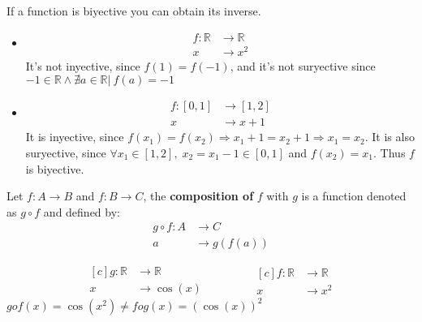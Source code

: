 \documentclass[12pt, a4paper]{book}
\begin{document}
\begin{rem}
  If a function is biyective you can obtain its inverse.
\end{rem}

\begin{exmp}
  \begin{itemize}
    \item 
    \begin{align*}
      f:\mathbb{R} &\longrightarrow \mathbb{R} \\
      x &\longrightarrow x^2
    \end{align*}
    It's not inyective, since $f(1) = f(-1)$, and it's not suryective since $-1\in\mathbb{R} \wedge \nexists a \in \mathbb{R}\vert\ f(a)=-1$

    \item 
    \begin{align*}
      f:[0,1] &\longrightarrow [1,2] \\
      x &\longrightarrow x+1
    \end{align*}
    It is inyective, since $f(x_1) = f(x_2) \Rightarrow x_1+1=x_2+1 \Rightarrow x_1 = x_2$. It is also suryective, since $\forall x_1 \in [1,2],\; x_2=x_1-1 \in [0,1]$ and $f(x_2) = x_1$. Thus $f$ is biyective.
  \end{itemize}
\end{exmp}

\begin{defn}
  \boldmath
  Let $f:A \longrightarrow B$ and $f:B \longrightarrow C$, the \textbf{composition of} $f$ with $g$ is a function denoted as $g \circ f$ and defined by:
  \begin{align*}
    g \circ f:A &\longrightarrow C \\
    a &\longrightarrow g(f(a))
  \end{align*}
  \unboldmath
\end{defn}

\begin{exmp}
  \begin{equation*}
    \begin{aligned}[c]
      g:\mathbb{R} &\longrightarrow \mathbb{R} \\
      x &\longrightarrow \cos (x)
    \end{aligned}
    \qquad \qquad
    \begin{aligned}[c]
      f:\mathbb{R} &\longrightarrow \mathbb{R} \\
      x &\longrightarrow x^2
    \end{aligned}
  \end{equation*}
  $g o f(x) = \cos (x^2) \neq f o g(x) = {(\cos(x))}^2$
\end{exmp}
\end{document}
